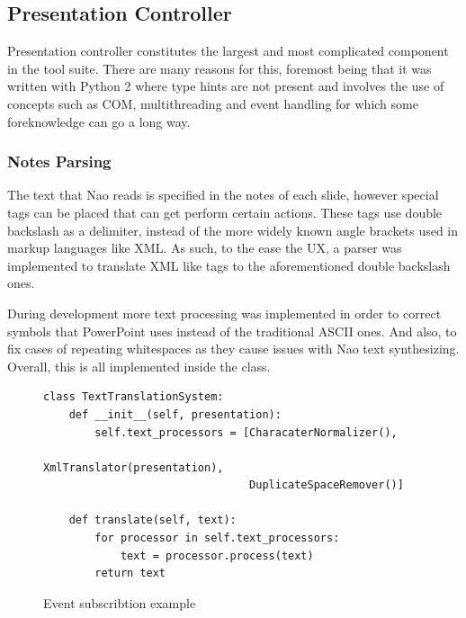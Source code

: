 \documentclass[12pt, fleqn, a4paper]{article}
\begin{document}
\subsection{Presentation Controller}
Presentation controller constitutes the largest and most complicated component in the tool suite. There are many reasons for this, foremost being that it was written with Python 2 where type hints are not present and involves the use of concepts such as COM, multithreading and event handling for which some foreknowledge can go a long way.
\subsubsection{Notes Parsing}
The text that Nao reads is specified in the notes of each slide, however special tags can be placed that can get perform certain actions. These tags use double backslash as a delimiter, instead of the more widely known angle brackets used in markup languages like XML. As such, to the ease the UX, a parser was implemented to translate XML like tags to the aforementioned double backslash ones.\par
During development more text processing was implemented in order to correct symbols that PowerPoint uses instead of the traditional ASCII ones. And also, to fix cases of repeating whitespaces as they cause issues with Nao text synthesizing. Overall, this is all implemented inside the  class.
\begin{figure}[H]
	\centering
	\begin{verbatim}
class TextTranslationSystem:
    def __init__(self, presentation):
        self.text_processors = [CharacaterNormalizer(),
                                XmlTranslator(presentation),
                                DuplicateSpaceRemover()]

    def translate(self, text):
        for processor in self.text_processors:
            text = processor.process(text)
        return text
	\end{verbatim}
	\caption{Event subscribtion example}
\end{figure}
\end{document}

